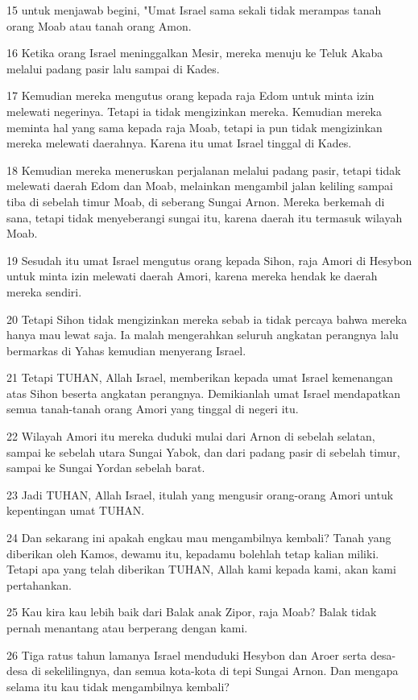 \par 15 untuk menjawab begini, "Umat Israel sama sekali tidak merampas tanah orang Moab atau tanah orang Amon.
\par 16 Ketika orang Israel meninggalkan Mesir, mereka menuju ke Teluk Akaba melalui padang pasir lalu sampai di Kades.
\par 17 Kemudian mereka mengutus orang kepada raja Edom untuk minta izin melewati negerinya. Tetapi ia tidak mengizinkan mereka. Kemudian mereka meminta hal yang sama kepada raja Moab, tetapi ia pun tidak mengizinkan mereka melewati daerahnya. Karena itu umat Israel tinggal di Kades.
\par 18 Kemudian mereka meneruskan perjalanan melalui padang pasir, tetapi tidak melewati daerah Edom dan Moab, melainkan mengambil jalan keliling sampai tiba di sebelah timur Moab, di seberang Sungai Arnon. Mereka berkemah di sana, tetapi tidak menyeberangi sungai itu, karena daerah itu termasuk wilayah Moab.
\par 19 Sesudah itu umat Israel mengutus orang kepada Sihon, raja Amori di Hesybon untuk minta izin melewati daerah Amori, karena mereka hendak ke daerah mereka sendiri.
\par 20 Tetapi Sihon tidak mengizinkan mereka sebab ia tidak percaya bahwa mereka hanya mau lewat saja. Ia malah mengerahkan seluruh angkatan perangnya lalu bermarkas di Yahas kemudian menyerang Israel.
\par 21 Tetapi TUHAN, Allah Israel, memberikan kepada umat Israel kemenangan atas Sihon beserta angkatan perangnya. Demikianlah umat Israel mendapatkan semua tanah-tanah orang Amori yang tinggal di negeri itu.
\par 22 Wilayah Amori itu mereka duduki mulai dari Arnon di sebelah selatan, sampai ke sebelah utara Sungai Yabok, dan dari padang pasir di sebelah timur, sampai ke Sungai Yordan sebelah barat.
\par 23 Jadi TUHAN, Allah Israel, itulah yang mengusir orang-orang Amori untuk kepentingan umat TUHAN.
\par 24 Dan sekarang ini apakah engkau mau mengambilnya kembali? Tanah yang diberikan oleh Kamos, dewamu itu, kepadamu bolehlah tetap kalian miliki. Tetapi apa yang telah diberikan TUHAN, Allah kami kepada kami, akan kami pertahankan.
\par 25 Kau kira kau lebih baik dari Balak anak Zipor, raja Moab? Balak tidak pernah menantang atau berperang dengan kami.
\par 26 Tiga ratus tahun lamanya Israel menduduki Hesybon dan Aroer serta desa-desa di sekelilingnya, dan semua kota-kota di tepi Sungai Arnon. Dan mengapa selama itu kau tidak mengambilnya kembali?
